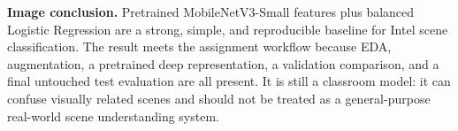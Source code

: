\begin{importantbox}
\textbf{Image conclusion.} Pretrained MobileNetV3-Small features plus balanced Logistic Regression are a strong, simple, and reproducible baseline for Intel scene classification. The result meets the assignment workflow because EDA, augmentation, a pretrained deep representation, a validation comparison, and a final untouched test evaluation are all present. It is still a classroom model: it can confuse visually related scenes and should not be treated as a general-purpose real-world scene understanding system.
\end{importantbox}
